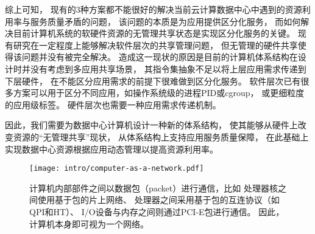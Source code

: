 综上可知，
现有的3种方案都不能很好的解决当前云计算数据中心中遇到的资源利用率与服务质量矛盾的问题，
该问题的本质是为应用提供区分化服务，
而如何解决目前计算机系统的软硬件资源的无管理共享状态是实现区分化服务的关键。
现有研究在一定程度上能够解决软件层次的共享管理问题，
但无管理的硬件共享使得该问题并没有被完全解决。
造成这一现状的原因是目前的计算机体系结构在设计时并没有考虑到多应用共享场景，
其指令集抽象不足以将上层应用需求传递到下层硬件，
在不能区分应用需求的前提下很难做到区分化服务。
软件层次已有很多方案可以用于区分不同应用，如操作系统级的进程PID或cgroup，
或更细粒度的应用级标签\cite{timecard:2013,d2p:2014, mesnier_differentiated_2011, thereska_ioflow:_2013}。
硬件层次也需要一种应用需求传递机制。

因此，我们需要为数据中心计算机设计一种新的体系结构，
使其能够从硬件上改变资源的``无管理共享''现状，
从体系结构上支持应用服务质量保障，
在此基础上实现数据中心资源根据应用动态管理以提高资源利用率。

\begin{figure}[t]
  \centering
  \texttt{[image: intro/computer-as-a-network.pdf]}
  \caption[计算机内部本质是一个网络]{
    计算机内部部件之间以数据包（packet）进行通信，比如
    处理器核之间使用基于包的片上网络、
    处理器之间采用基于包的互连协议（如QPI和HT）、
    I/O设备与内存之间则通过PCI-E包进行通信。
    因此，计算机本身即可视为一个网络。}
  \label{fig:computer-as-a-network}
\end{figure}

